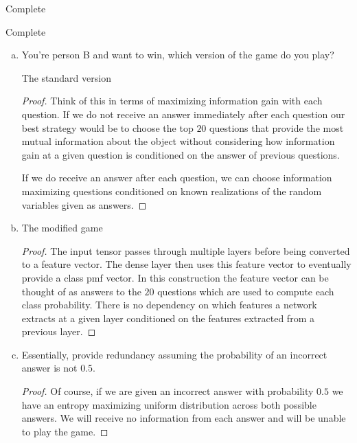 \documentclass[11pt]{article}
\begin{document}
Complete

Complete

\noindent
\begin{enumerate}[(a)]\itemsep0pt
\item You're person B and want to win, which version of the game do you play?
	\begin{solution}
		The standard version
	\end{solution}

	\begin{proof}
		Think of this in terms of maximizing information gain with each
		question. If we do not receive an answer immediately after each
		question our best strategy would be to choose the top $20$ questions
		that provide the most mutual information about the object without
		considering how information gain at a given question is conditioned on
		the answer of previous questions.
		\newline

		If we do receive an answer after each question, we can choose
		information maximizing questions conditioned on known realizations of the
		random variables given as answers.
	\end{proof}

\item
	\begin{solution}
		The modified game
	\end{solution}
	\begin{proof}
		The input tensor passes through multiple layers before being converted
		to a feature vector. The dense layer then uses this feature vector to
		eventually provide a class pmf vector. In this construction the feature
		vector can be thought of as answers to the $20$ questions which are
		used to compute each class probability. There is no dependency on which
		features a network extracts at a given layer conditioned on the
		features extracted from a previous layer.
	\end{proof}

\item
	\begin{solution}
		Essentially, provide redundancy assuming the probability of an
		incorrect answer is not $0.5$.
	\end{solution}
	\begin{proof}
		Of course, if we are given an incorrect answer with probability $0.5$
		we have an entropy maximizing uniform distribution across both possible
		answers. We will receive no information from each answer and will be
		unable to play the game.
		\newline


\end{proof}
\end{enumerate}
\end{document}
